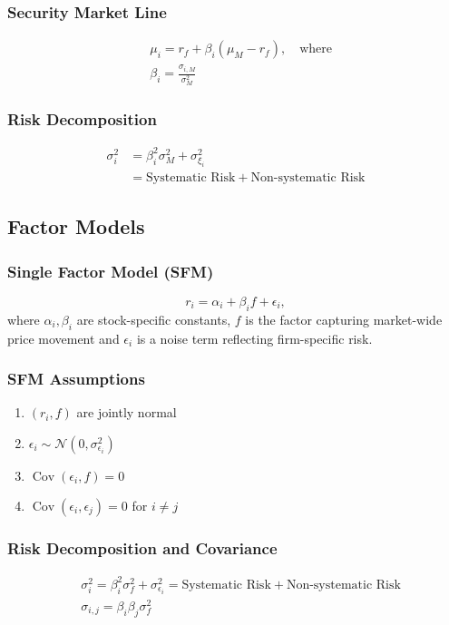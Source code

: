 \documentclass[11pt]{article}
\newcommand{\Cov}{\operatorname{Cov}}
\begin{document}
	\subsubsection{Security Market Line}
	
	\begin{align*}
	&\mu_i = r_f + \beta_i (\mu_M - r_f), \quad\text{where} \\[4pt]
	&\beta_i = \frac{\sigma_{i, M}}{\sigma_{M}^2}
	\end{align*}	
	\subsubsection{Risk Decomposition}
	\begin{align*}
		\sigma_i^2 & = \beta_i^2 \sigma_M^2 + \sigma_{\xi_{i}}^2 \\
		& = \text{Systematic Risk} + \text{Non-systematic Risk}
	\end{align*}	
	\subsection{Factor Models}
	\subsubsection{Single Factor Model (SFM)}
	\[	r_i = \alpha_i + \beta_i f + \epsilon_i, \]
	where \( \alpha_i, \beta_i \) are stock-specific constants, \( f \) is the factor capturing market-wide price movement and \( \epsilon_i \) is a noise term reflecting firm-specific risk.
	\subsubsection{SFM Assumptions}
	\begin{enumerate}
		\item \( (r_i, f) \) are jointly normal
		\item \( \epsilon_i\sim\mathcal{N}(0, \sigma_{\epsilon_i}^2) \)
		\item \( \Cov(\epsilon_i, f) = 0 \)
		\item \( \Cov(\epsilon_i, \epsilon_j) = 0 \) for \( i\neq j \)
	\end{enumerate}
	\subsubsection{Risk Decomposition and Covariance}
	\begin{align*}
	& \sigma_i^2 = \beta_i^2 \sigma_f^2 + \sigma_{\epsilon_{i}}^2 = \text{Systematic Risk} + \text{Non-systematic Risk}\\
	& \sigma_{i, j} = \beta_i \beta_j \sigma_f^2
	\end{align*}
\end{document}
